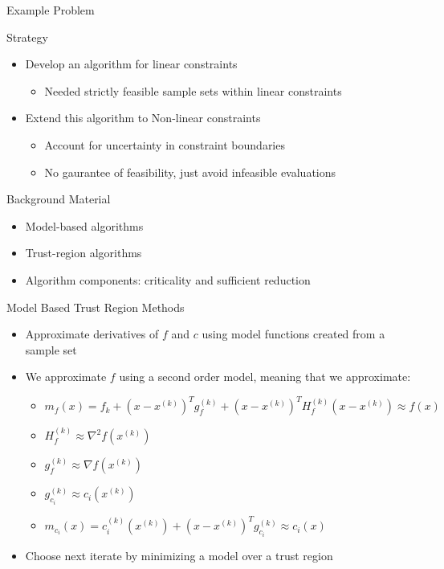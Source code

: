 \documentclass{beamer}
\newcommand{\xk}{{{x}^{(k)}}}
\newcommand{\mk}{{m_f}}
\newcommand{\fk}{{f_k}}
\newcommand{\fgk}{{g^{(k)}_f}}
\newcommand{\fhk}{{H^{(k)}_f}}
\newcommand{\ck}{{c^{(k)}_{i}(\xk)}}
\newcommand{\cgk}{{g^{(k)}_{c_i}}}
\newcommand{\mck}{{m_{c_i}}}
\begin{document}
\begin{frame}{Example Problem}

\end{frame}


\begin{frame}{Strategy}
	\begin{itemize}
		\item Develop an algorithm for linear constraints
		\begin{itemize}
			\item Needed strictly feasible sample sets within linear constraints
		\end{itemize}
		\item Extend this algorithm to Non-linear constraints
		\begin{itemize}
			\item Account for uncertainty in constraint boundaries
			\item No gaurantee of feasibility, just avoid infeasible evaluations
		\end{itemize}
	\end{itemize}
\end{frame}




\begin{frame}{Background Material}
	\begin{itemize}
		\item Model-based algorithms
		\item Trust-region algorithms
		\item Algorithm components: criticality and sufficient reduction
	\end{itemize}
\end{frame}

\begin{frame}{Model Based Trust Region Methods}
	\begin{itemize}
		\setlength\itemsep{2em}
		\item Approximate derivatives of $f$ and $c$ using model functions created from a sample set
		\item We approximate $f$ using a second order model, meaning that we approximate:
		\begin{itemize}
			\item $\mk(x) = \fk + \left(x - \xk \right)^T\fgk + \left(x - \xk \right)^T\fhk\left(x - \xk \right) \approx f(x)$
			\item $\fhk \approx \nabla ^2 f(\xk)$
			\item $\fgk \approx \nabla f(\xk)$
			\item $\cgk \approx c_i(\xk)$
			\item $\mck(x) = \ck + \left(x - \xk\right)^T\cgk \approx c_i(x)$
		\end{itemize}
		\item Choose next iterate by minimizing a model over a trust region
	\end{itemize}
\end{frame}
\end{document}
